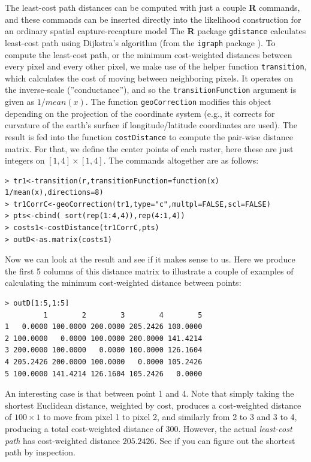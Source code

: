 The least-cost path distances can be 
computed with just a couple {\bf R} commands, and these commands can
be inserted directly into the likelihood construction for an ordinary
spatial capture-recapture model The {\bf R} package
\mbox{\tt gdistance} calculates least-cost path using  Dijkstra's algorithm
\citep{dijkstra:1959} (from the \mbox{\tt igraph} package
\citep{csardi:2010}).  
To compute the least-cost path, or the minimum cost-weighted distances
between every pixel and every other pixel, we make use of the helper
function \mbox{\tt transition}, which calculates the cost of moving
between neighboring pixels.  It operates on the inverse-scale
(''conductance''), and so the \mbox{\tt transitionFunction} argument
is given as $1/mean(x)$.  The function \mbox{\tt geoCorrection}
modifies this object depending on the projection of the coordinate
system (e.g., it corrects for curvature of the earth's surface if
longitude/latitude coordinates are used).  The result is fed into the
function \mbox{\tt costDistance} to compute the pair-wise distance
matrix. For that, we define the center points of each raster, here
these are just integers on $[1,4] \times [1,4]$.  The commands
altogether are as follows: {\small
\begin{verbatim}
> tr1<-transition(r,transitionFunction=function(x) 1/mean(x),directions=8)
> tr1CorrC<-geoCorrection(tr1,type="c",multpl=FALSE,scl=FALSE)
> pts<-cbind( sort(rep(1:4,4)),rep(4:1,4))
> costs1<-costDistance(tr1CorrC,pts)
> outD<-as.matrix(costs1)
\end{verbatim}
}
Now we can look at the result and see if it makes sense to us. Here we
produce the first 5 columns of this distance matrix to illustrate a
couple of examples of calculating the minimum cost-weighted distance
between points: 
\begin{center}
{\small
\begin{verbatim}
> outD[1:5,1:5]
         1        2        3        4        5
1   0.0000 100.0000 200.0000 205.2426 100.0000
2 100.0000   0.0000 100.0000 200.0000 141.4214
3 200.0000 100.0000   0.0000 100.0000 126.1604
4 205.2426 200.0000 100.0000   0.0000 105.2426
5 100.0000 141.4214 126.1604 105.2426   0.0000
\end{verbatim}
}
\end{center}
An interesting case is that between point 1 and 4. Note that simply
taking the shortest Euclidean distance, weighted by cost, produces a
cost-weighted distance of $100 \times 1$ to move from pixel 1 to pixel
2, and similarly from 2 to 3 and 3 to 4, producing a total
cost-weighted distance of $300$. However, the actual {\it least-cost
  path} has cost-weighted distance $205.2426$. See if you can figure
out the shortest path by inspection.

